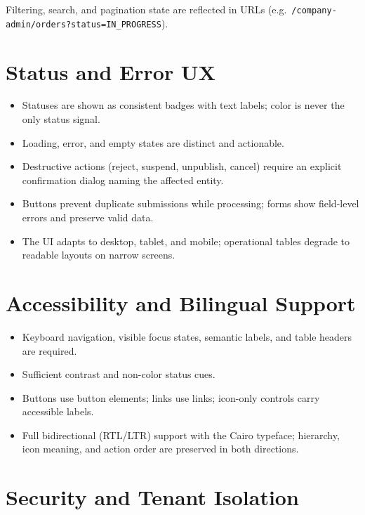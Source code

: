 \documentclass[11pt,a4paper]{article}
\begin{document}
Filtering, search, and pagination state are reflected in URLs (e.g.\ \texttt{/company-admin/orders?status=IN\_PROGRESS}).

\section{Status and Error UX}
\label{sec:status-ux}

\begin{itemize}[leftmargin=2em, itemsep=2pt]
  \item Statuses are shown as consistent badges with text labels; color is never the only status signal.
  \item Loading, error, and empty states are distinct and actionable.
  \item Destructive actions (reject, suspend, unpublish, cancel) require an explicit confirmation dialog naming the affected entity.
  \item Buttons prevent duplicate submissions while processing; forms show field-level errors and preserve valid data.
  \item The UI adapts to desktop, tablet, and mobile; operational tables degrade to readable layouts on narrow screens.
\end{itemize}

\section{Accessibility and Bilingual Support}
\label{sec:a11y}

\begin{itemize}[leftmargin=2em, itemsep=2pt]
  \item Keyboard navigation, visible focus states, semantic labels, and table headers are required.
  \item Sufficient contrast and non-color status cues.
  \item Buttons use button elements; links use links; icon-only controls carry accessible labels.
  \item Full bidirectional (RTL/LTR) support with the Cairo typeface; hierarchy, icon meaning, and action order are preserved in both directions.
\end{itemize}

\section{Security and Tenant Isolation}
\label{sec:security}
\end{document}
